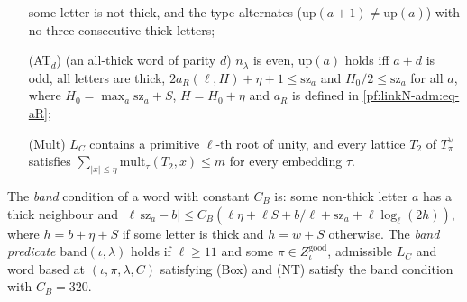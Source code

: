 \begin{definition}[Words]
\begin{itemize}
  some letter is not thick, and the type alternates ($\mathrm{up}(a+1)\ne\mathrm{up}(a)$) with no three consecutive
  thick letters;
\item[(AT$_d$)] (an all-thick word of parity $d$) $n_\lambda$ is even, $\mathrm{up}(a)$ holds iff $a+d$ is odd, all
  letters are thick, $2a_R(\ell,H)+\eta+1\le\mathrm{sz}_a$ and $H_0/2\le\mathrm{sz}_a$ for all $a$, where
  $H_0=\max_a\mathrm{sz}_a+S$, $H=H_0+\eta$ and $a_R$ is defined in \eqref{pf:linkN-adm:eq-aR};
\item[(Mult)] $L_C$ contains a primitive $\ell$-th root of unity, and every lattice $T_2$ of $T^\vee_\pi$
  satisfies $\sum_{|x|\le\eta}\mathrm{mult}_\tau(T_2,x)\le m$ for every embedding $\tau$.
\end{itemize}
The \emph{band} condition of a word with constant $C_B$ is: some non-thick letter $a$ has a thick neighbour and
$|\ell\,\mathrm{sz}_a-b|\le C_B(\ell\eta+\ell S+b/\ell+\mathrm{sz}_a+\ell\log_\ell(2h))$, where $h=b+\eta+S$ if some
letter is thick and $h=w+S$ otherwise. The \emph{band predicate} $\mathrm{band}(\iota,\lambda)$ holds if $\ell\ge11$ and
some $\pi\in Z^{\mathrm{good}}_\iota$, admissible $L_C$ and word based at $(\iota,\pi,\lambda,C)$ satisfying (Box) and
(NT) satisfy the band condition with $C_B=320$.
\end{definition}

